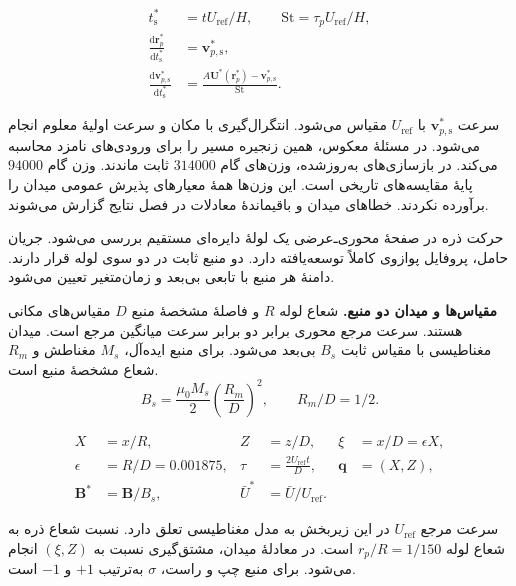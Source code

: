 \begin{equation}
\begin{aligned}
t_{\mathrm s}^*&=t U_{\mathrm{ref}}/H,\qquad
\mathrm{St}=\tau_p U_{\mathrm{ref}}/H,\\
\frac{\mathrm d\mathbf r_p^*}{\mathrm dt_{\mathrm s}^*}
&=\mathbf v_{p,\mathrm s}^*,\\
\frac{\mathrm d\mathbf v_{p,\mathrm s}^*}{\mathrm dt_{\mathrm s}^*}
&=\frac{A\mathbf U^*(\mathbf r_p^*)-\mathbf v_{p,\mathrm s}^*}{\mathrm{St}}.
\end{aligned}
\label{eq:forward-flow-stokes-path}
\end{equation}

سرعت $\mathbf v_{p,\mathrm s}^*$ با $U_{\mathrm{ref}}$ مقیاس می‌شود.
انتگرال‌گیری با مکان و سرعت اولیهٔ معلوم انجام می‌شود.
در مسئلهٔ معکوس، همین زنجیره مسیر را برای ورودی‌های نامزد محاسبه می‌کند.
در بازسازی‌های به‌روزشده، وزن‌های گام $314000$ ثابت ماندند.
وزن گام $94000$ پایهٔ مقایسه‌های تاریخی است.
این وزن‌ها همهٔ معیارهای پذیرش عمومی میدان را برآورده نکردند.
خطاهای میدان و باقیماندهٔ معادلات در فصل نتایج گزارش می‌شوند.

\label{sec:forward-magnetic-operator}

حرکت ذره در صفحهٔ محوری‌ـ‌عرضی یک لولهٔ دایره‌ای مستقیم بررسی می‌شود.
جریان حامل، پروفایل پوازوی کاملاً توسعه‌یافته دارد.
دو منبع ثابت در دو سوی لوله قرار دارند.
دامنهٔ هر منبع با تابعی بی‌بعد و زمان‌متغیر تعیین می‌شود.

\textbf{مقیاس‌ها و میدان دو منبع.}
شعاع لوله $R$ و فاصلهٔ مشخصهٔ منبع $D$ مقیاس‌های مکانی هستند.
سرعت مرجع محوری برابر دو برابر سرعت میانگین مرجع است.
میدان مغناطیسی با مقیاس ثابت $B_s$ بی‌بعد می‌شود.
برای منبع ایده‌آل، $M_s$ مغناطش و $R_m$ شعاع مشخصهٔ منبع است.
\[
B_s=\frac{\mu_0 M_s}{2}\left(\frac{R_m}{D}\right)^2,
\qquad R_m/D=1/2.
\]

\begin{equation}
\begin{aligned}
X&=x/R,& Z&=z/D,& \xi&=x/D=\epsilon X,\\
\epsilon&=R/D=0.001875,&
\tau&=\frac{2U_{\mathrm{ref}}t}{D},&
\mathbf q&=(X,Z),\\
\mathbf B^*&=\mathbf B/B_s,&
\bar U^*&=\bar U/U_{\mathrm{ref}}.
\end{aligned}
\label{eq:forward-mag-scales}
\end{equation}

سرعت مرجع $U_{\mathrm{ref}}$ در این زیربخش به مدل مغناطیسی تعلق دارد.
نسبت شعاع ذره به شعاع لوله $r_p/R=1/150$ است.
در معادلهٔ میدان، مشتق‌گیری نسبت به $(\xi,Z)$ انجام می‌شود.
برای منبع چپ و راست، $\sigma$ به‌ترتیب $+1$ و $-1$ است.

